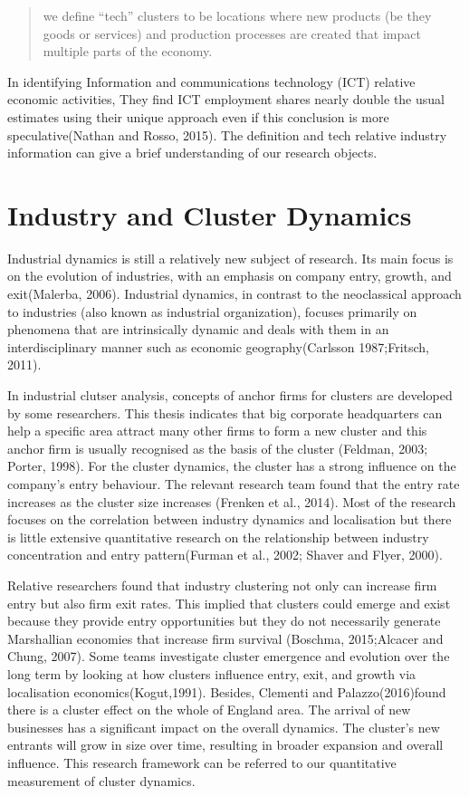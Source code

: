 \documentclass[
  12pt,
  oneside]{book}
\begin{document}
\begin{quote}
we define ``tech'' clusters to be locations where new products (be they goods or services) and production processes are created that impact multiple parts of the economy.
\end{quote}

In identifying Information and communications technology (ICT) relative economic activities, They find ICT employment shares nearly double the usual estimates using their unique approach even if this conclusion is more speculative(Nathan and Rosso, 2015). The definition and tech relative industry information can give a brief understanding of our research objects.

\hypertarget{industry-and-cluster-dynamics}{%
\section{Industry and Cluster Dynamics}\label{industry-and-cluster-dynamics}}

Industrial dynamics is still a relatively new subject of research. Its main focus is on the evolution of industries, with an emphasis on company entry, growth, and exit(Malerba, 2006). Industrial dynamics, in contrast to the neoclassical approach to industries (also known as industrial organization), focuses primarily on phenomena that are intrinsically dynamic and deals with them in an interdisciplinary manner such as economic geography(Carlsson 1987;Fritsch, 2011).

In industrial clutser analysis, concepts of anchor firms for clusters are developed by some researchers. This thesis indicates that big corporate headquarters can help a specific area attract many other firms to form a new cluster and this anchor firm is usually recognised as the basis of the cluster (Feldman, 2003; Porter, 1998). For the cluster dynamics, the cluster has a strong influence on the company's entry behaviour. The relevant research team found that the entry rate increases as the cluster size increases (Frenken et al., 2014). Most of the research focuses on the correlation between industry dynamics and localisation but there is little extensive quantitative research on the relationship between industry concentration and entry pattern(Furman et al., 2002; Shaver and Flyer, 2000).

Relative researchers found that industry clustering not only can increase firm entry but also firm exit rates. This implied that clusters could emerge and exist because they provide entry opportunities but they do not necessarily generate Marshallian economies that increase firm survival (Boschma, 2015;Alcacer and Chung, 2007). Some teams investigate cluster emergence and evolution over the long term by looking at how clusters influence entry, exit, and growth via localisation economics(Kogut,1991). Besides, Clementi and Palazzo(2016)found there is a cluster effect on the whole of England area. The arrival of new businesses has a significant impact on the overall dynamics. The cluster's new entrants will grow in size over time, resulting in broader expansion and overall influence. This research framework can be referred to our quantitative measurement of cluster dynamics.
\end{document}
